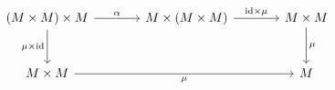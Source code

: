 \documentclass[border=6pt]{standalone}
\newcommand{\id}{\mathrm{id}}
\begin{document}
$
\begin{tikzcd}[column sep=large, row sep=large]
  (M \times M) \times M \arrow[r, "\alpha"] \arrow[d, "\mu \times \id"'] & M \times (M \times M) \arrow[r, "\id \times \mu"] & M \times M \arrow[d, "\mu"] \\
  M \times M \arrow[rr, "\mu"'] & & M
\end{tikzcd}
$
\end{document}
